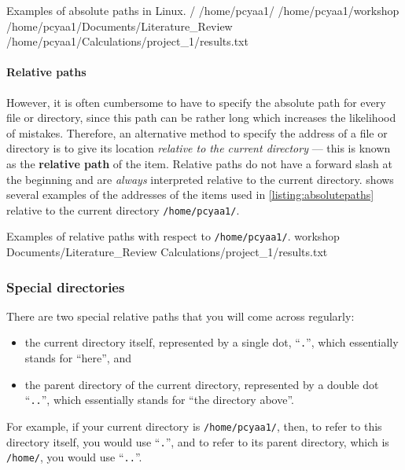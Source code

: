         \begin{bashoutput}[label=listing:absolutepaths]{Examples of absolute paths in Linux.}
          /
          /home/pcyaa1/
          /home/pcyaa1/workshop
          /home/pcyaa1/Documents/Literature_Review
          /home/pcyaa1/Calculations/project_1/results.txt
        \end{bashoutput}

      \paragraph{Relative paths}
        However, it is often cumbersome to have to specify the absolute path for every file or directory, since this path can be rather long which increases the likelihood of mistakes.
        Therefore, an alternative method to specify the address of a file or directory is to give its location \emph{relative to the current directory} --- this is known as the \textbf{relative path} of the item.
        Relative paths do not have a forward slash at the beginning and are \emph{always} interpreted relative to the current directory.
         shows several examples of the addresses of the items used in \cref{listing:absolutepaths} relative to the current directory \texttt{/home/pcyaa1/}.

         \begin{bashoutput}[label=listing:relpaths]{Examples of relative paths with respect to \texttt{/home/pcyaa1/}.}
           workshop
           Documents/Literature_Review
           Calculations/project_1/results.txt
         \end{bashoutput}

      \subsubsection{Special directories}

        There are two special relative paths that you will come across regularly:
        \begin{itemize}
          \item the current directory itself, represented by a single dot, \enquote{\texttt{.}}, which essentially stands for \enquote{here}, and
          \item the parent directory of the current directory, represented by a double dot \enquote{\texttt{..}}, which essentially stands for \enquote{the directory above}.
        \end{itemize}
        For example, if your current directory is \texttt{/home/pcyaa1/}, then, to refer to this directory itself, you would use \enquote{\texttt{.}}, and to refer to its parent directory, which is \texttt{/home/}, you would use \enquote{\texttt{..}}.

